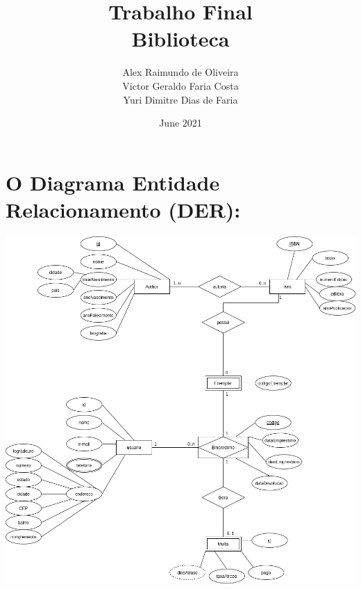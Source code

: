 \documentclass{article}
\title{Trabalho Final \\ Biblioteca}
\author{ Alex Raimundo de Oliveira \\ Victor Geraldo Faria Costa\\ Yuri Dimitre Dias de Faria}
\date{June 2021}
\begin{document}
    
    \maketitle
\section*{O Diagrama Entidade Relacionamento (DER):}
\includegraphics[height=\hsize]{../docs/DER2.png}
\end{document}
